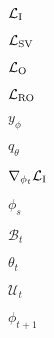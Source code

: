 $\mathcal{L}_{\rm I}$

$\mathcal{L}_{\rm SV}$

$\mathcal{L}_{\rm O}$

$\mathcal{L}_{\rm RO}$

$y_\phi$

$q_\theta$

$\nabla_{\phi_t}\mathcal{L}_{\rm I}$

$\phi_s$

$\mathcal{B}_t$

$\theta_t$

$\mathcal{U}_t$

$\phi_{t+1}$